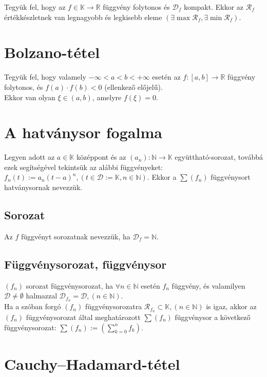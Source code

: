 \documentclass[margin=0px]{article}
\begin{document}
Tegyük fel, hogy az $f \in \mathbb{K} \to \mathbb{R}$ függvény folytonos és $\mathcal{D}_{f}$ kompakt. Ekkor az $\mathcal{R}_{f}$ értékkészletnek van legnagyobb és legkisebb eleme $(\exists \max{\mathcal{R}_{f}}, \exists \min{\mathcal{R}_{f}})$.

\section{Bolzano-tétel}

Tegyük fel, hogy valamely $-\infty < a < b < +\infty$ esetén az $f:[a,b] \to \mathbb{R}$ függvény folytonos, és $f(a) \cdot f(b) < 0$ (ellenkező előjelű). \\
Ekkor van olyan $\xi \in (a,b)$, amelyre $f(\xi) = 0$.

\section{A hatványsor fogalma}

Legyen adott az $a \in \mathbb{K}$ középpont és az $(a_{n}): \mathbb{N} \to \mathbb{K}$ együttható-sorozat, továbbá ezek segítségével tekintsük az alábbi függvényeket: $f_{n}(t) := a_{n}(t-a)^{n}, (t \in \mathcal{D} := \mathbb{K}, n \in \mathbb{N})$. Ekkor a $\sum{(f_{n})}$ függvénysort hatványsornak nevezzük.

\subsection{Sorozat}

Az $f$ függvényt sorozatnak nevezzük, ha $\mathcal{D}_{f} = \mathbb{N}$.

\subsection{Függvénysorozat, függvénysor}

$(f_{n})$ sorozat függvénysorozat, ha $\forall n \in \mathbb{N}$ esetén $f_{n}$ függvény, és valamilyen $\mathcal{D} \neq \emptyset$ halmazzal $\mathcal{D}_{f_{n}} = \mathcal{D}, (n \in \mathbb{N})$. \\
Ha a szóban forgó $(f_{n})$ függvénysorozatra $\mathcal{R}_{f_{n}} \subset \mathbb{K}, (n \in \mathbb{N})$ is igaz, akkor az $(f_{n})$ függvénysorozat által meghatározott $\sum{(f_{n})}$ függvénysor a következő függvénysorozat: $\sum{(f_{n})} := (\sum\limits_{k=0}^{n}{f_{k}})$.

\section{Cauchy--Hadamard-tétel}
\end{document}
